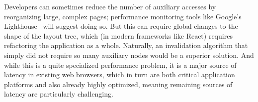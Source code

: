 Developers can sometimes reduce the number of auxiliary accesses
  by reorganizing large, complex pages;
  performance monitoring tools
  like Google's Lighthouse~\cite{lighthouse}
  will suggest doing so.
But this can require global changes to the shape of the layout tree,
  which (in modern frameworks like React)
  requires refactoring the application as a whole.
Naturally, an invalidation algorithm that simply
  did not require so many auxiliary nodes
  would be a superior solution.
And while this is a quite specialized performance problem,
  it is a major source of latency in existing web browsers,
  which in turn are both critical application platforms
  and also already highly optimized,
  meaning remaining sources of latency are
  particularly challenging.